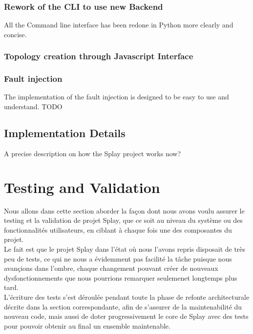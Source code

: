 \documentclass{eplmastersthesis}
\begin{document}


      \subsection{Rework of the CLI to use new Backend}

        All the Command line interface has been redone in Python more clearly and concise.

      \subsection{Topology creation through Javascript Interface}

      \subsection{Fault injection}

        The implementation of the fault injection is designed to be easy to use and understand. TODO


    \section{Implementation Details}

      A precise description on how the Splay project works now?


  \chapter{Testing and Validation}

    Nous allons dans cette section aborder la façon dont nous avons voulu assurer
    le testing et la validation de projet Splay, que ce soit au niveau du système
    ou des fonctionnalités utilisateurs, en ciblant à chaque fois une des
    composantes du projet.\\

    Le fait est que le projet Splay dans l'état où nous l'avons repris disposait
    de très peu de tests, ce qui ne nous a évidemment pas facilité la tâche puisque
    nous avançions dans l'ombre, chaque changement pouvant créer de nouveaux
    dysfonctionnements que nous pourrions remarquer seulemenet longtemps plus tard.\\

    L'écriture des tests s'est déroulée pendant toute la phase de refonte
    architecturale décrite dans la section correspondante, afin de s'assurer
    de la maintenabilité du nouveau code, mais aussi de doter progressivement
    le core de Splay avec des tests pour pouvoir obtenir au final un ensemble
    maintenable.\\
\end{document}
